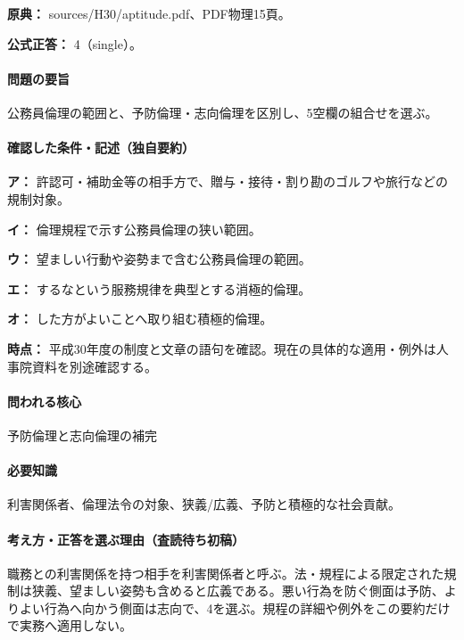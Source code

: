 \noindent\textbf{原典：} sources/H30/aptitude.pdf、PDF物理15頁。

\textbf{公式正答：} 4（single）。

\paragraph{問題の要旨} 公務員倫理の範囲と、予防倫理・志向倫理を区別し、5空欄の組合せを選ぶ。

\paragraph{確認した条件・記述（独自要約）}\mbox{}\par

\noindent\textbf{ア：} 許認可・補助金等の相手方で、贈与・接待・割り勘のゴルフや旅行などの規制対象。\par

\noindent\textbf{イ：} 倫理規程で示す公務員倫理の狭い範囲。\par

\noindent\textbf{ウ：} 望ましい行動や姿勢まで含む公務員倫理の範囲。\par

\noindent\textbf{エ：} するなという服務規律を典型とする消極的倫理。\par

\noindent\textbf{オ：} した方がよいことへ取り組む積極的倫理。\par

\noindent\textbf{時点：} 平成30年度の制度と文章の語句を確認。現在の具体的な適用・例外は人事院資料を別途確認する。\par

\paragraph{問われる核心} 予防倫理と志向倫理の補完

\paragraph{必要知識} 利害関係者、倫理法令の対象、狭義/広義、予防と積極的な社会貢献。

\paragraph{考え方・正答を選ぶ理由（査読待ち初稿）} 職務との利害関係を持つ相手を利害関係者と呼ぶ。法・規程による限定された規制は狭義、望ましい姿勢も含めると広義である。悪い行為を防ぐ側面は予防、よりよい行為へ向かう側面は志向で、4を選ぶ。規程の詳細や例外をこの要約だけで実務へ適用しない。

